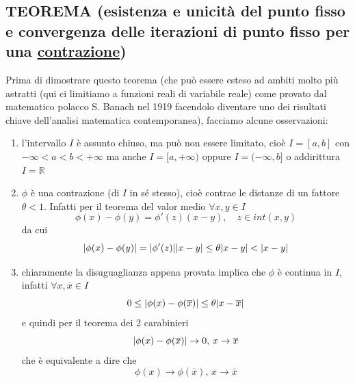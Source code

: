 \documentclass[12pt]{article}
\DeclarePairedDelimiter{\abs}{\lvert}{\rvert}
\begin{document}
\subsection{TEOREMA (esistenza e unicità del punto fisso e convergenza delle iterazioni di punto fisso per una \uline{contrazione})}
\begin{center}
\end{center}
Prima di dimostrare questo teorema (che può essere esteso ad ambiti molto più astratti (qui ci limitiamo a funzioni reali di variabile reale) come provato dal matematico polacco S. Banach nel 1919 facendolo diventare uno dei risultati chiave dell'analisi matematica contemporanea), facciamo alcune osservazioni:
\begin{enumerate}
    \item l'intervallo $I$ è assunto chiuso, ma può non essere limitato, cioè $I=[a,b]$ con $-\infty < a < b < +\infty$ ma anche $I=[a, +\infty)$ oppure $I = (-\infty,b]$ o addirittura $I=\mathbb{R}$
    \item $\phi$ è una contrazione (di $I$ in sé stesso), cioè contrae le distanze di un fattore $\theta < 1$. Infatti per il teorema del valor medio $\forall x,y \in I$
    \[ \phi(x)-\phi(y)=\phi'(z)(x-y), \quad z \in int(x,y) \]
    da cui
    \[ \abs{\phi(x)-\phi(y)}=\abs{\phi'(z)}\abs{x-y}\leq\theta\abs{x-y}<\abs{x-y}\]
    \item chiaramente la disuguaglianza appena provata implica che $\phi$ è continua in $I$, infatti $\forall x,\overline{x}\in I$
    \[ 0 \leq \abs{\phi(x)-\phi(\overline{x})} \leq \theta \abs{x-\overline{x}} \]
    e quindi per il teorema dei 2 carabinieri
    \[ \abs{\phi(x)-\phi(\overline{x})} \rightarrow 0, \, x \rightarrow \overline{x} \]
    che è equivalente a dire che
    \[ \phi(x) \rightarrow \phi(\bar{x}),\, x \rightarrow \bar{x} \]
\end{enumerate}
\end{document}

